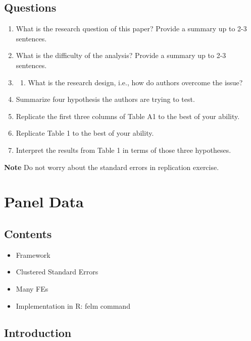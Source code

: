 \documentclass[]{book}
\providecommand{\tightlist}{%
  \setlength{\itemsep}{0pt}\setlength{\parskip}{0pt}}
\begin{document}
\section{Questions}\label{questions-2}

\begin{enumerate}
\def\labelenumi{\arabic{enumi}.}
\item
  What is the research question of this paper? Provide a summary up to
  2-3 sentences.
\item
  What is the difficulty of the analysis? Provide a summary up to 2-3
  sentences.
\item
  \begin{enumerate}
  \def\labelenumii{\arabic{enumii}.}
  \setcounter{enumii}{2}
  \tightlist
  \item
    What is the research design, i.e., how do authors overcome the
    issue?
  \end{enumerate}
\item
  Summarize four hypothesis the authors are trying to test.
\item
  Replicate the first three columns of Table A1 to the best of your
  ability.
\item
  Replicate Table 1 to the best of your ability.
\item
  Interpret the results from Table 1 in terms of those three hypotheses.
\end{enumerate}

\textbf{Note} Do not worry about the standard errors in replication
exercise.

\chapter{Panel Data}\label{panel-data}

\section{Contents}\label{contents}

\begin{itemize}
\tightlist
\item
  Framework
\item
  Clustered Standard Errors
\item
  Many FEs
\item
  Implementation in R: felm command
\end{itemize}

\section{Introduction}\label{introduction-2}
\end{document}
